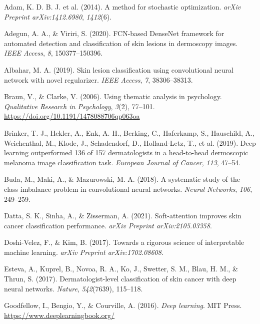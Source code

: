 \documentclass[
  12pt,
  oneside]{article}
\newlength{\cslhangindent}
\newenvironment{CSLReferences}[2] %
 {\begin{list}{}{%
  \setlength{\itemindent}{0pt}
  \setlength{\leftmargin}{0pt}
  \setlength{\parsep}{0pt}
  \ifodd #1
   \setlength{\leftmargin}{\cslhangindent}
   \setlength{\itemindent}{-1\cslhangindent}
  \fi
  \setlength{\itemsep}{#2\baselineskip}}}
 {\end{list}}
\begin{document}
\label{refs}
\begin{CSLReferences}{1}{0}
Adam, K. D. B. J. et al. (2014). A method for stochastic optimization.
\emph{arXiv Preprint arXiv:1412.6980}, \emph{1412}(6).

Adegun, A. A., \& Viriri, S. (2020). FCN-based DenseNet framework for
automated detection and classification of skin lesions in dermoscopy
images. \emph{IEEE Access}, \emph{8}, 150377--150396.

Albahar, M. A. (2019). Skin lesion classification using convolutional
neural network with novel regularizer. \emph{IEEE Access}, \emph{7},
38306--38313.

Braun, V., \& Clarke, V. (2006). Using thematic analysis in psychology.
\emph{Qualitative Research in Psychology}, \emph{3}(2), 77--101.
\url{https://doi.org/10.1191/1478088706qp063oa}

Brinker, T. J., Hekler, A., Enk, A. H., Berking, C., Haferkamp, S.,
Hauschild, A., Weichenthal, M., Klode, J., Schadendorf, D.,
Holland-Letz, T., et al. (2019). Deep learning outperformed 136 of 157
dermatologists in a head-to-head dermoscopic melanoma image
classification task. \emph{European Journal of Cancer}, \emph{113},
47--54.

Buda, M., Maki, A., \& Mazurowski, M. A. (2018). A systematic study of
the class imbalance problem in convolutional neural networks.
\emph{Neural Networks}, \emph{106}, 249--259.

Datta, S. K., Sinha, A., \& Zisserman, A. (2021). Soft-attention
improves skin cancer classification performance. \emph{arXiv Preprint
arXiv:2105.03358}.

Doshi-Velez, F., \& Kim, B. (2017). Towards a rigorous science of
interpretable machine learning. \emph{arXiv Preprint arXiv:1702.08608}.

Esteva, A., Kuprel, B., Novoa, R. A., Ko, J., Swetter, S. M., Blau, H.
M., \& Thrun, S. (2017). Dermatologist-level classification of skin
cancer with deep neural networks. \emph{Nature}, \emph{542}(7639),
115--118.

Goodfellow, I., Bengio, Y., \& Courville, A. (2016). \emph{Deep
learning}. MIT Press. \url{https://www.deeplearningbook.org/}


\end{CSLReferences}
\end{document}

